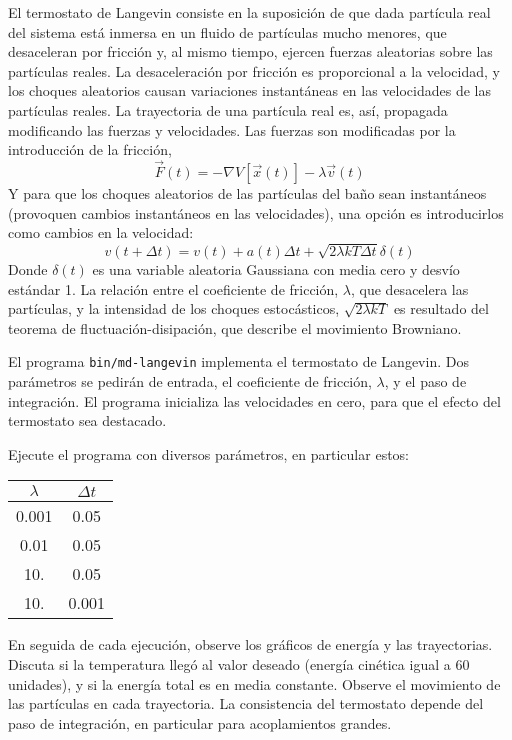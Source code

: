 El termostato de Langevin consiste en la suposición de que dada
partícula real del sistema está inmersa en un fluido de partículas mucho
menores, que desaceleran por fricción y, al mismo tiempo,
ejercen fuerzas aleatorias sobre las partículas reales. La
desaceleración por fricción es proporcional a la velocidad, y los
choques aleatorios causan variaciones instantáneas en las velocidades de
las partículas reales. La trayectoria de una partícula real es, así,
propagada modificando las fuerzas y velocidades. Las fuerzas son
modificadas por la introducción de la fricción,
\[
\vec{F}(t) = -\nabla V[\vec{x}(t)] - \lambda \vec{v}(t)
\]
Y para que los choques aleatorios de las partículas del baño sean
instantáneos (provoquen cambios instantáneos en las velocidades), una
opción es introducirlos como cambios en la velocidad:
\[
v(t+\Delta t) = v(t) + a(t)\Delta t 
+ \sqrt{2\lambda kT \Delta t}\delta(t)
\] 
Donde $\delta(t)$ es una variable aleatoria Gaussiana con media cero y
desvío estándar 1. La relación entre el coeficiente de fricción, $\lambda$,
que desacelera las partículas, y la intensidad de los choques
estocásticos, $\sqrt{2\lambda kT}$ es resultado del teorema de
fluctuación-disipación, que describe el movimiento Browniano.

El programa {\tt bin/md-langevin} implementa el termostato de Langevin.
Dos parámetros se pedirán de entrada, el coeficiente de fricción,
$\lambda$, y el paso de integración. El programa inicializa las velocidades
en cero, para que el efecto del termostato sea destacado.

Ejecute el programa con diversos parámetros, en particular estos:

{\tt \begin{center}\begin{tabular}{cc}
\hline
 $\lambda$ & $\Delta t$ \\
\hline
0.001 & 0.05 \\
0.01  & 0.05 \\
10.   & 0.05 \\
10.   & 0.001 \\
\hline
\end{tabular}\end{center}}

En seguida de cada ejecución, observe los gráficos de energía y las
trayectorias. Discuta si la temperatura llegó al valor deseado (energía
cinética igual a 60 unidades), y si la energía total es en media
constante. Observe el movimiento de las partículas en cada trayectoria. 
La consistencia del termostato depende del paso de integración, en
particular para acoplamientos grandes.  


